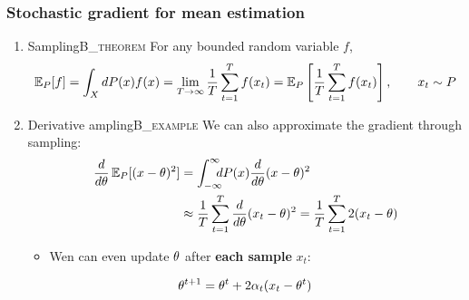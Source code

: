 \documentclass[smaller]{article}
\begin{document}
\subsubsection{Stochastic gradient for mean estimation}
\label{sec:org7fa3fec}
\begin{enumerate}
\item Sampling\hfill{}\textsc{B\_theorem}
\label{sec:org026069e}
For any bounded random variable \(f\), 
\[
\mathop{\mbox{\ensuremath{\mathbb{E}}}}\nolimits_P[f] = \int_{X} dP(x) f(x)
 = 
\lim_{T \to \infty} \frac{1}{T} \sum_{t=1}^T f(x_t)
 = 
\mathop{\mbox{\ensuremath{\mathbb{E}}}}\nolimits_P \left[\frac{1}{T} \sum_{t=1}^T f(x_t)\right]
, \qquad x_t \sim P
\]
\item Derivative ampling\hfill{}\textsc{B\_example}
\label{sec:orgf8a22f5}
We can also approximate the gradient through sampling:
\begin{align*}
 \frac{d}{d\theta} \mathop{\mbox{\ensuremath{\mathbb{E}}}}\nolimits_P [(x - \theta)^2] 
&= \int_{-\infty}^\infty \!\!\!\! dP(x) \frac{d}{d\theta} (x - \theta)^2
\\
&\approx \frac{1}{T} \sum_{t=1}^T \frac{d}{d\theta} (x_t - \theta)^2
= \frac{1}{T} \sum_{t=1}^T 2(x_t - \theta)
\end{align*}
\begin{itemize}
\item Wen can even update \(\theta\) after \textbf{each sample} \(x_t\):
\end{itemize}
\[
\theta^{t+1} = \theta^t + 2 \alpha_t (x_t - \theta^t)
\]
\end{enumerate}
\end{document}
